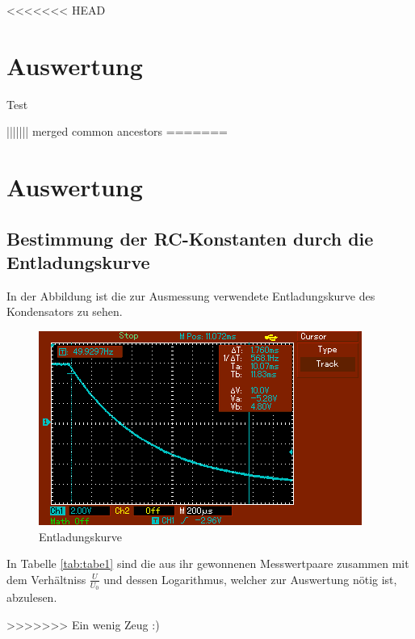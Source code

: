 <<<<<<< HEAD
\section{Auswertung}
\label{sec:Auswertung}

Test

||||||| merged common ancestors
=======
\section{Auswertung}
\subsection{Bestimmung der RC-Konstanten durch die Entladungskurve}
In der Abbildung %
ist die zur Ausmessung verwendete Entladungskurve des Kondensators zu sehen.
\begin{figure}[H]
  \centering
  \includegraphics{kurve}
  \caption{Entladungskurve}
  \label{fig:kurve}
\end{figure}
In Tabelle \ref{tab:tabe1} sind die aus ihr gewonnenen Messwertpaare zusammen mit
dem Verhältniss $ \frac{U}{U_0} $ und dessen Logarithmus, welcher zur
Auswertung nötig ist, abzulesen.

>>>>>>> Ein wenig Zeug :)
